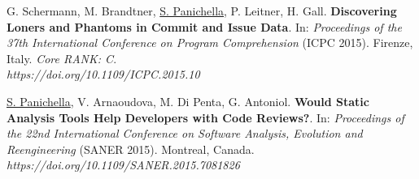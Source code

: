 \documentclass[10pt]{article}
\begin{document}
\begin{bibenum}
    \item  \label{C15}  G. Schermann, M. Brandtner,  \underline{S. Panichella}, P. Leitner,  H. Gall. \textbf{Discovering Loners and Phantoms in Commit and Issue Data}. In: \emph{Proceedings of the 37th International Conference on Program Comprehension} (ICPC 2015). Firenze, Italy.  \textit{Core RANK: C}. \\\textit{https://doi.org/10.1109/ICPC.2015.10}


    \item   \label{C16}  \underline{S. Panichella}, V. Arnaoudova, M. Di Penta, G. Antoniol. \textbf{Would Static Analysis Tools Help Developers with Code Reviews?}.  In: \emph{Proceedings of the 22nd International Conference on Software Analysis, Evolution and Reengineering} (SANER 2015). Montreal, Canada. \\\textit{https://doi.org/10.1109/SANER.2015.7081826}  %

\end{bibenum}
\end{document}
